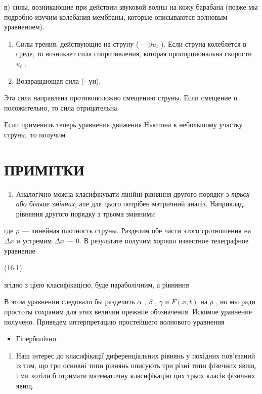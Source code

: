 \documentclass[
  ukrainian,
]{article}
\providecommand{\tightlist}{%
  \setlength{\itemsep}{0pt}\setlength{\parskip}{0pt}}
\begin{document}
в) силы, возникающие при действии звуковой волны на кожу барабана (позже
мы подробно изучим колебания мембраны, которые описываются волновым
уравнением).

\begin{enumerate}
\def\labelenumi{\arabic{enumi}.}
\setcounter{enumi}{2}
\item
  Силы трения, действующие на струну (--- \(\beta u_t\) ). Если струна
  колеблется в среде, то возникает сила сопротивления, которая
  пропорциональна скорости \(u_t\) .
\item
  Возвращающая сила (- үи).
\end{enumerate}

Эта сила направлена противоположно смещению струны. Если смещение u
положительно, то сила отрицательна.

Если применить теперь уравнения движения Ньютона к небольшому участку
струны, то получим

\section{ПРИМІТКИ}\label{ux43fux440ux438ux43cux456ux442ux43aux438-2}

\begin{enumerate}
\def\labelenumi{\arabic{enumi}.}
\tightlist
\item
  Аналогічно можна класифікувати лінійні рівняння другого порядку з
  \emph{трьох або більше змінних}, але для цього потрібен матричний
  аналіз. Наприклад, рівняння другого порядку з трьома змінними
\end{enumerate}

где \(\rho\) --- линейная плотность струны. Разделим обе части этого
сротношения на \(\Delta x\) и устремим \(\Delta x\) --- 0. В результате
получим хорошо известное телеграфное уравнение

(16.1)

згідно з цією класифікацією, буде параболічним, а рівняння

В этом уравнении следовало бы разделить \(\alpha\) , \(\beta\) ,
\(\gamma\) и \(F(x,t)\) на \(\rho\) , но мы ради простоты сохраним для
этих величин прежние обозначения. Искомое уравнение получено. Приведем
интерпретацию простейшего волнового уравнения

\begin{itemize}
\tightlist
\item
  Гіперболічно.
\end{itemize}

\begin{enumerate}
\def\labelenumi{\arabic{enumi}.}
\setcounter{enumi}{1}
\tightlist
\item
  Наш інтерес до класифікації диференціальних рівнянь у похідних
  пов'язаний із тим, що три основні типи рівнянь описують три різні типи
  фізичних явищ, і ми хотіли б отримати математичну класифікацію цих
  трьох класів фізичних явищ.
\end{enumerate}
\end{document}
